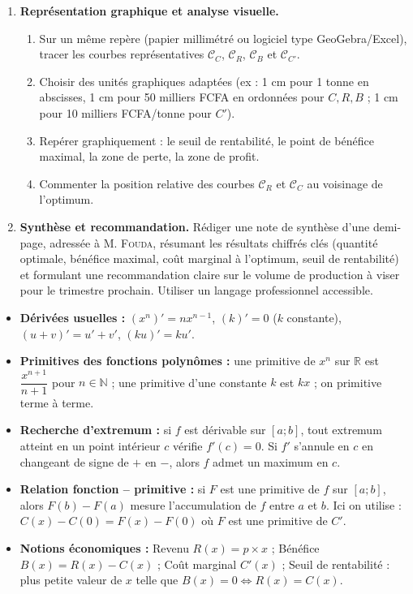\documentclass[11pt]{article}
\newcounter{popsec}
\newcounter{popsub}
\newcommand{\courssub}[1]{%
  \stepcounter{popsub}%
  \par\vspace{9pt}\noindent{\popxbold\fontsize{11.5}{13}\selectfont\color{popink}{\color{poporange}\thepopsec.\thepopsub}\hspace{6pt}#1}\par\nopagebreak\vspace{4pt}
}
\begin{document}
\begin{enumerate}
    \item \textbf{Représentation graphique et analyse visuelle.}
    \begin{enumerate}
        \item Sur un même repère (papier millimétré ou logiciel type GeoGebra/Excel), tracer les courbes représentatives $\mathcal{C}_C$, $\mathcal{C}_R$, $\mathcal{C}_B$ et $\mathcal{C}_{C'}$.
        \item Choisir des unités graphiques adaptées (ex : 1 cm pour 1 tonne en abscisses, 1 cm pour 50 milliers FCFA en ordonnées pour $C,R,B$ ; 1 cm pour 10 milliers FCFA/tonne pour $C'$).
        \item Repérer graphiquement : le seuil de rentabilité, le point de bénéfice maximal, la zone de perte, la zone de profit.
        \item Commenter la position relative des courbes $\mathcal{C}_R$ et $\mathcal{C}_C$ au voisinage de l'optimum.
    \end{enumerate}

    \item \textbf{Synthèse et recommandation.}
    Rédiger une note de synthèse d'une demi-page, adressée à M. \textsc{Fouda}, résumant les résultats chiffrés clés (quantité optimale, bénéfice maximal, coût marginal à l'optimum, seuil de rentabilité) et formulant une recommandation claire sur le volume de production à viser pour le trimestre prochain. Utiliser un langage professionnel accessible.
\end{enumerate}

\courssub{Ressources à mobiliser}
\begin{itemize}
    \item \textbf{Dérivées usuelles :} $(x^n)' = nx^{n-1}$, $(k)' = 0$ ($k$ constante), $(u+v)' = u'+v'$, $(ku)' = ku'$.
    \item \textbf{Primitives des fonctions polynômes :} une primitive de $x^n$ sur $\mathbb{R}$ est $\dfrac{x^{n+1}}{n+1}$ pour $n \in \mathbb{N}$ ; une primitive d'une constante $k$ est $kx$ ; on primitive terme à terme.
    \item \textbf{Recherche d'extremum :} si $f$ est dérivable sur $[a;b]$, tout extremum atteint en un point intérieur $c$ vérifie $f'(c)=0$. Si $f'$ s'annule en $c$ en changeant de signe de $+$ en $-$, alors $f$ admet un maximum en $c$.
    \item \textbf{Relation fonction -- primitive :} si $F$ est une primitive de $f$ sur $[a;b]$, alors $F(b)-F(a)$ mesure l'accumulation de $f$ entre $a$ et $b$. Ici on utilise : $C(x) - C(0) = F(x) - F(0)$ où $F$ est une primitive de $C'$.
    \item \textbf{Notions économiques :} Revenu $R(x) = p \times x$ ; Bénéfice $B(x) = R(x) - C(x)$ ; Coût marginal $C'(x)$ ; Seuil de rentabilité : plus petite valeur de $x$ telle que $B(x)=0 \iff R(x)=C(x)$.
\end{itemize}
\end{document}
